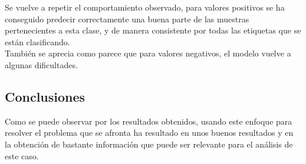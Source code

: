 Se vuelve a repetir el comportamiento observado, para valores positivos se ha conseguido predecir correctamente una buena parte de las muestras pertenecientes a esta clase, y de manera consistente por todas las etiquetas que se están clasificando.\\
También se aprecia como parece que para valores negativos, el modelo vuelve a algunas dificultades.
\subsection{Conclusiones}
Como se puede observar por los resultados obtenidos, usando este enfoque para resolver el problema que se afronta ha resultado en unos buenos resultados y en la obtención de bastante información que puede ser relevante para el análisis de este caso.\linebreak

